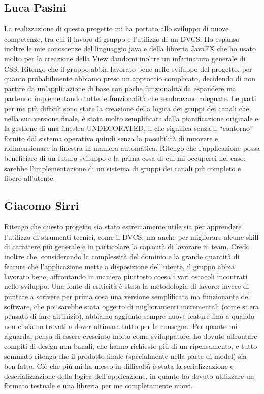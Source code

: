 \documentclass[a4paper,12pt]{report}
\begin{document}
\subsection{Luca Pasini}
La realizzazione di questo progetto mi ha portato allo sviluppo di nuove competenze, tra cui il lavoro di gruppo e l’utilizzo di un DVCS.  Ho espanso inoltre le mie conoscenze del linguaggio java e della libreria JavaFX che ho usato molto per la creazione della View dandomi inoltre un infarinatura generale di CSS. Ritengo che il gruppo abbia lavorato bene nello sviluppo del progetto, per quanto probabilmente abbiamo preso un approccio complicato, decidendo di non partire da un'applicazione di base con poche funzionalità da espandere ma partendo implementando tutte le funzionalità che sembravano adeguate.
Le parti per me più difficili sono state la creazione della logica dei gruppi dei canali che, nella sua versione finale, è stata molto semplificata dalla pianificazione originale e la gestione di una finestra UNDECORATED, il che significa senza il “contorno” fornito dal sistema operativo quindi senza la possibilità di muovere e ridimensionare la finestra in maniera automatica.
Ritengo che l’applicazione possa beneficiare di un futuro sviluppo e la prima cosa di cui mi occuperei nel caso, sarebbe l’implementazione di un sistema di gruppi dei canali più completo e libero all’utente.
\endsubsection
\subsection{Giacomo Sirri}
Ritengo che questo progetto sia stato estremamente utile sia per apprendere l’utilizzo di strumenti tecnici, come il DVCS, ma anche per migliorare alcune skill di carattere più generale e in particolare la capacità di lavorare in team. Credo inoltre che, considerando la complessità del dominio e la grande quantità di feature che l’applicazione mette a disposizione dell’utente, il gruppo abbia lavorato bene, affrontando in maniera piuttosto coesa i vari ostacoli incontrati nello sviluppo. 
Una fonte di criticità è stata la metodologia di lavoro: invece di puntare a scrivere per prima cosa una versione semplificata ma funzionante del software, che poi sarebbe stata oggetto di miglioramenti incrementali (come si era pensato di fare all’inizio), abbiamo aggiunto sempre nuove feature fino a quando non ci siamo trovati a dover ultimare tutto per la consegna.
Per quanto mi riguarda, penso di essere cresciuto molto come sviluppatore: ho dovuto affrontare compiti di design non banali, che hanno richiesto più di un ripensamento, e tutto sommato ritengo che il prodotto finale (specialmente nella parte di model) sia ben fatto. Ciò che più mi ha messo in difficoltà è stata la serializzazione e deserializzazione della logica dell’applicazione, in quanto ho dovuto utilizzare un formato testuale e una libreria per me completamente nuovi. 
\end{document}
